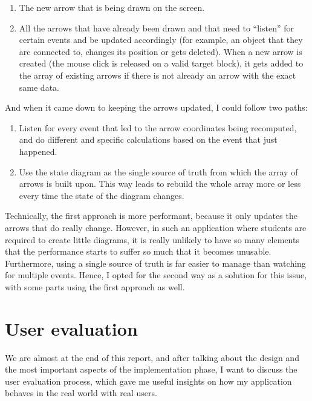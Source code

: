 \documentclass[]{usiinfbachelorproject}
\begin{document}
\begin{enumerate}
	\item The new arrow that is being drawn on the screen.
	\item All the arrows that have already been drawn and that need to ``listen'' for certain events and be updated accordingly (for example, an object that they are connected to, changes its position or gets deleted). When a new arrow is created (the mouse click is released on a valid target block), it gets added to the array of existing arrows if there is not already an arrow with the exact same data. 
\end{enumerate}

\noindent And when it came down to keeping the arrows updated, I could follow two paths:

\begin{enumerate}
	\item Listen for every event that led to the arrow coordinates being recomputed, and do different and specific calculations based on the event that just happened.
	\item Use the state diagram as the single source of truth from which the array of arrows is built upon. This way leads to rebuild the whole array more or less every time the state of the diagram changes.
\end{enumerate}

\noindent Technically, the first approach is more performant, because it only updates the arrows that do really change. However, in such an application where students are required to create little diagrams, it is really unlikely to have so many elements that the performance starts to suffer so much that it becomes unusable. Furthermore, using a single source of truth is far easier to manage than watching for multiple events. Hence, I opted for the second way as a solution for this issue, with some parts using the first approach as well.


\vspace{\fill}

\pagebreak

\section{User evaluation} \label{Testing}

We are almost at the end of this report, and after talking about the design and the most important aspects of the implementation phase, I want to discuss the user evaluation process, which gave me useful insights on how my application behaves in the real world with real users.
\end{document}
